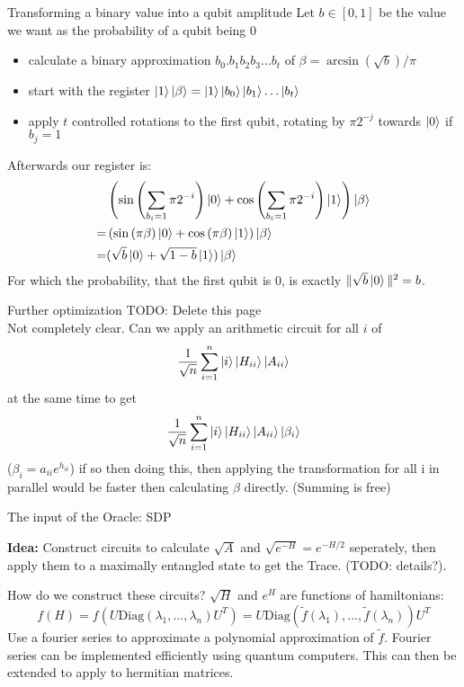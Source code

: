 \begin{frame}{Transforming a binary value into a qubit amplitude}
Let $b\in [0,1]$ be the value we want as the probability of a qubit being 0
\begin{itemize}
\item calculate a binary approximation $b_0.b_1b_2b_3\ldots b_t$ of $\beta=\arcsin(\sqrt{b})/\pi$
\item start with the register $\ket{1}\ket{\beta}=\ket{1}\ket{b_0}\ket{b_1}\ldots\ket{b_t}$
\item apply $t$ controlled rotations to the first qubit, rotating by $\pi 2^{-j}$ towards $\ket{0}$ if $b_j=1$
\end{itemize}
Afterwards our register is: 
\begin{align*}
&\left(\sin\left(\sum_{b_i=1} \pi 2^{-i}\right)\ket{0}
+\cos\left(\sum_{b_i=1} \pi 2^{-i}\right)\ket{1}\right)
 \ket{\beta}\\
=&\left(\sin\left(\pi\beta\right)\ket{0}
+\cos\left(\pi\beta\right)\ket{1}\right)
 \ket{\beta}\\
=&(\sqrt{b}\ket{0}+\sqrt{1-b}\ket{1})\ket{\beta}
\end{align*}
For which the probability, that the first qubit is 0, is exactly $\|\sqrt{b}\ket{0}\|^2=b$.
\end{frame}

\begin{frame}{Further optimization}
TODO: Delete this page\\
Not completely clear.  Can we apply an arithmetic circuit for all $i$ of 
\begin{equation*}
\frac{1}{\sqrt{n}}\sum_{i=1}^n\ket{i}\ket{H_{ii}}\ket{A_{ii}}
\end{equation*}
at the same time to get
\begin{equation*}
\frac{1}{\sqrt{n}}\sum_{i=1}^n\ket{i}\ket{H_{ii}}\ket{A_{ii}}\ket{\beta_i}
\end{equation*}
($\beta_i=a_{ii}e^{h_{ii}}$)
if so then doing this, then applying the transformation for all i in parallel would be faster then calculating $\beta$ directly. (Summing is free)

\end{frame}

\begin{frame}{The input of the Oracle: SDP}

\textbf{Idea: } Construct circuits to calculate $\sqrt{A}$ and $\sqrt{e^{-H}}=e^{-H/2}$ seperately, then apply them to a maximally entangled state to get the Trace. (TODO: details?). 

\begin{block}{How do we construct these circuits?}
$\sqrt{H}$ and $e^{H}$ are functions of hamiltonians:
\begin{equation*}
f(H)=f(U \mathrm{Diag}(\lambda_1,\ldots, \lambda_n) U^T)=U \mathrm{Diag}(\tilde{f}(\lambda_1),\ldots,\tilde{f}(\lambda_n))U^T
\end{equation*}
Use a fourier series to approximate a polynomial approximation of $\tilde{f}$. Fourier series can be implemented efficiently using quantum computers. This can then be extended to apply to hermitian matrices.
\end{block}
\end{frame}


